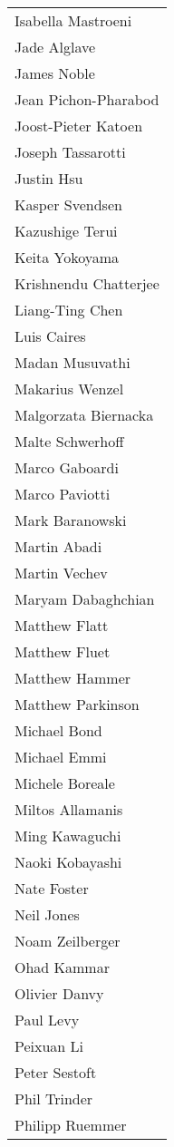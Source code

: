 \begin{tabular}[t]{p{\namewidth}}
   Isabella Mastroeni
\\ Jade Alglave
\\ James Noble
\\ Jean Pichon-Pharabod
\\ Joost-Pieter Katoen
\\ Joseph Tassarotti
\\ Justin Hsu
\\ Kasper Svendsen
\\ Kazushige Terui
\\ Keita Yokoyama
\\ Krishnendu Chatterjee
\\ Liang-Ting Chen
\\ Luis Caires
\\ Madan Musuvathi
\\ Makarius Wenzel
\\ Malgorzata Biernacka
\\ Malte Schwerhoff
\\ Marco Gaboardi
\\ Marco Paviotti
\\ Mark Baranowski
\\ Martin Abadi
\\ Martin Vechev
\\ Maryam Dabaghchian
\\ Matthew Flatt
\\ Matthew Fluet
\\ Matthew Hammer
\\ Matthew Parkinson
\\ Michael Bond
\\ Michael Emmi
\\ Michele Boreale
\\ Miltos Allamanis
\\ Ming Kawaguchi
\\ Naoki Kobayashi
\\ Nate Foster
\\ Neil Jones
\\ Noam Zeilberger
\\ Ohad Kammar
\\ Olivier Danvy
\\ Paul Levy
\\ Peixuan Li
\\ Peter Sestoft
\\ Phil Trinder
\\ Philipp Ruemmer
\end{tabular}%

